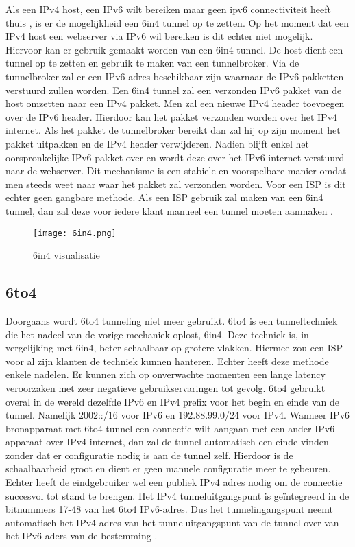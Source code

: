 Als een IPv4 host, een IPv6 wilt bereiken maar geen ipv6 connectiviteit heeft thuis , is er de mogelijkheid een  6in4 tunnel op te zetten. Op het moment dat een IPv4 host een webserver via IPv6 wil bereiken is dit echter niet mogelijk. Hiervoor kan er gebruik gemaakt worden van een 6in4 tunnel. De host dient een tunnel op te zetten en gebruik te maken van een tunnelbroker. Via de tunnelbroker zal er een IPv6 adres beschikbaar zijn waarnaar de IPv6 pakketten verstuurd zullen worden. Een 6in4 tunnel zal een verzonden IPv6 pakket van de host omzetten naar een IPv4 pakket. Men zal een nieuwe IPv4 header toevoegen over de IPv6 header. Hierdoor kan het pakket verzonden worden over het IPv4 internet. Als het pakket de tunnelbroker bereikt dan zal hij op zijn moment het pakket uitpakken en de IPv4 header verwijderen. Nadien blijft enkel het oorspronkelijke IPv6 pakket over en wordt deze over het IPv6 internet verstuurd naar de webserver. Dit mechanisme is een stabiele en voorspelbare manier omdat men steeds weet naar waar het pakket zal verzonden worden. Voor een ISP is dit echter geen gangbare methode. Als een ISP gebruik zal maken van een 6in4 tunnel, dan zal deze voor iedere klant manueel een tunnel moeten aanmaken \autocite{RIPE2016}. 

\begin{figure}
\texttt{[image: 6in4.png]}
\centering
\caption{6in4 visualisatie \autocite{RIPE2016}}
\centering
\end{figure}

\subsection{6to4}

Doorgaans wordt 6to4 tunneling niet meer gebruikt. 6to4 is een tunneltechniek die het nadeel van de vorige mechaniek oplost, 6in4. Deze techniek is, in vergelijking met 6in4, beter schaalbaar op grotere vlakken. Hiermee zou een ISP voor al zijn klanten de techniek kunnen hanteren. Echter heeft deze methode enkele nadelen. Er kunnen zich op onverwachte momenten een lange latency veroorzaken met zeer negatieve gebruikservaringen tot gevolg. 6to4 gebruikt overal in de wereld dezelfde IPv6 en IPv4 prefix voor het begin en einde van de tunnel. Namelijk 2002::/16 voor IPv6 en 192.88.99.0/24 voor IPv4. Wanneer IPv6 bronapparaat met 6to4 tunnel een connectie wilt aangaan met een ander IPv6 apparaat over IPv4 internet, dan zal de tunnel automatisch een einde vinden zonder dat er configuratie nodig is aan de tunnel zelf. Hierdoor is de schaalbaarheid groot en dient er geen manuele configuratie meer te gebeuren. Echter heeft de eindgebruiker wel een publiek IPv4 adres nodig om de connectie succesvol tot stand te brengen. Het IPv4 tunneluitgangspunt is geïntegreerd in de bitnummers 17-48 van het 6to4 IPv6-adres. Dus het tunnelingangspunt neemt automatisch het IPv4-adres van het tunneluitgangspunt van de tunnel over van het IPv6-aders van de bestemming \autocite{RIPE2016}.

